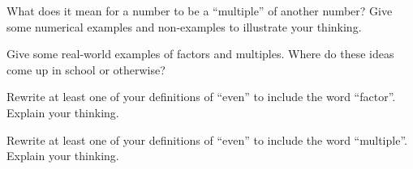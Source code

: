 \documentclass{ximera}
\begin{document}
\begin{problem} What does it mean for a number to be a ``multiple'' of another number? Give some numerical examples and non-examples to illustrate your thinking.
\end{problem}


\begin{problem} Give some real-world examples of factors and multiples. Where do these ideas come up in school or otherwise?
\end{problem}

\begin{problem} Rewrite at least one of your definitions of ``even'' to include the word ``factor''. Explain your thinking.
\end{problem}

\begin{problem} Rewrite at least one of your definitions of ``even'' to include the word ``multiple''. Explain your thinking.
\end{problem}
\end{document}

